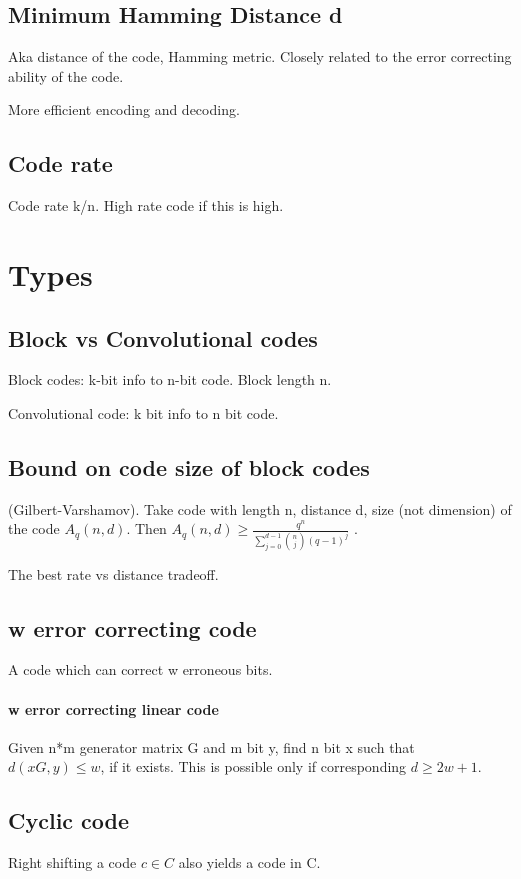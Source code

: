 \documentclass[oneside, article]{memoir}
\begin{document}
\subsection{Minimum Hamming Distance d}
Aka distance of the code, Hamming metric. Closely related to the error correcting ability of the code.

More efficient encoding and decoding. \why

\subsection{Code rate}
Code rate k/n. High rate code if this is high.

\section{Types}
\subsection{Block vs Convolutional codes}
Block codes: k-bit info to n-bit code. Block length n.

Convolutional code: k bit info to n bit code.

\subsection{Bound on code size of block codes}
(Gilbert-Varshamov). Take code with length n, distance d, size (not dimension) of the code $A_{q}(n, d)$. Then $A_{q}(n, d) \geq \frac{q^{n}}{\sum_{j=0}^{d-1} \binom{n}{j}(q-1)^{j}}$ \why.

The best rate vs distance tradeoff.

\subsection{w error correcting code}
A code which can correct w erroneous bits.

\paragraph*{w error correcting linear code}
Given n*m generator matrix G and m bit y, find n bit x such that $d(xG, y) \leq w$, if it exists. This is possible only if corresponding $d \geq 2w+1$.

\subsection{Cyclic code}
Right shifting a code $c \in C$ also yields a code in C.
\end{document}
